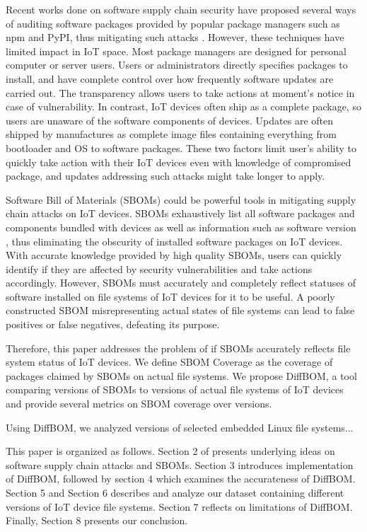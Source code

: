 Recent works done on software supply chain security have proposed several ways of auditing software packages provided by popular package managers such as npm and PyPI, thus mitigating such attacks \cite{Taxonomy, Towards_Measure, Towards_Using, What_are_npm, Phantom_artifacts}. However, these techniques have limited impact in IoT space. Most package managers are designed for personal computer or server users. Users or administrators directly specifies packages to install, and have complete control over how frequently software updates are carried out. The transparency allows users to take actions at moment's notice in case of vulnerability. In contrast, IoT devices often ship as a complete package, so users are unaware of the software components of devices. Updates are often shipped by manufactures as complete image files containing everything from bootloader and OS to software packages. These two factors limit user's ability to quickly take action with their IoT devices even with knowledge of compromised package, and updates addressing such attacks might take longer to apply.\par
Software Bill of Materials (SBOMs) could be powerful tools in mitigating supply chain attacks on IoT devices. SBOMs exhaustively list all software packages and components bundled with devices as well as information such as software version \cite{What_is_a_sbom}, thus eliminating the obscurity of installed software packages on IoT devices. With accurate knowledge provided by high quality SBOMs, users can quickly identify if they are affected by security vulnerabilities and take actions accordingly. However, SBOMs must accurately and completely reflect statuses of software installed on file systems of IoT devices for it to be useful. A poorly constructed SBOM misrepresenting actual states of file systems can lead to false positives or false negatives, defeating its purpose.\par
Therefore, this paper addresses the problem of if SBOMs accurately reflects file system status of IoT devices. We define SBOM Coverage as the coverage of packages claimed by SBOMs on actual file systems. We propose DiffBOM, a tool comparing versions of SBOMs to versions of actual file systems of IoT devices and provide several metrics on SBOM coverage over versions.\par
Using DiffBOM, we analyzed versions of selected embedded Linux file systems... \par
This paper is organized as follows. Section 2 of presents underlying ideas on software supply chain attacks and SBOMs. Section 3 introduces implementation of DiffBOM, followed by section 4 which examines the accurateness of DiffBOM. Section 5 and Section 6 describes and analyze our dataset containing different versions of IoT device file systems. Section 7 reflects on limitations of DiffBOM. Finally, Section 8 presents our conclusion.

